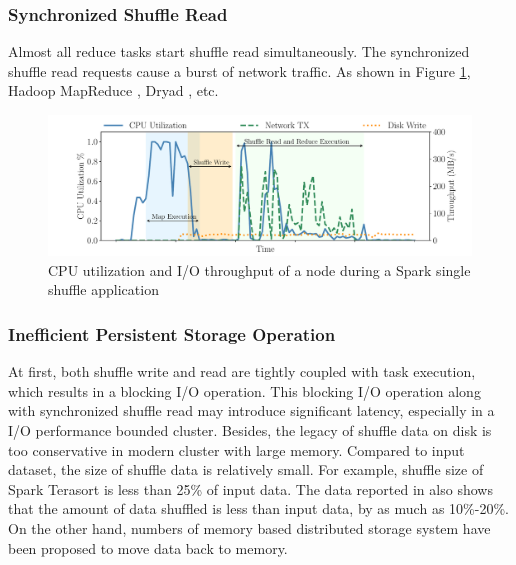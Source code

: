 \subsubsection{Synchronized Shuffle Read}
Almost all reduce tasks start shuffle read simultaneously. 
The synchronized shuffle read requests cause a burst of network traffic. 
As shown in Figure \ref{fig:util}, 
 Hadoop MapReduce \cite{hadoop}, Dryad \cite{dryad}, etc.

\begin{figure}
	\includegraphics[width=\linewidth]{fig/util}
	\caption{CPU utilization and I/O throughput of a node during a Spark single shuffle application}
	\label{fig:util}
	\vspace{-1em}
\end{figure}

\subsubsection{Inefficient Persistent Storage Operation}
At first, both shuffle write and read are tightly coupled with task execution, which results in a blocking I/O operation. 
This blocking I/O operation along with synchronized shuffle read may introduce significant latency, especially in a I/O performance bounded cluster.
Besides, the legacy of  shuffle data on disk is too conservative in modern cluster with large memory. 
Compared to input dataset, the size of shuffle data is relatively small. 
For example, shuffle size of Spark Terasort \cite{spark-tera} is less than 25\% of input data. 
The data reported in \cite{makingsense} also shows that the amount of data shuffled is less than input data, by as much as 10\%-20\%. 
On the other hand, numbers of memory based distributed storage system have been proposed \cite{memcached, tachyon, ramcloud} to move data back to memory. 


